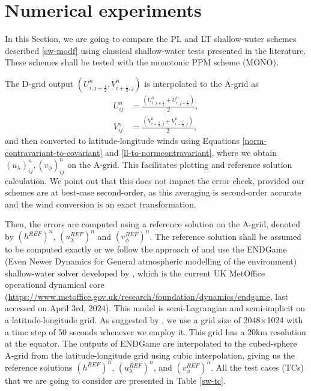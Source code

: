 \section{Numerical experiments}
\label{sec:numerical_results}
In this Section, we are going to compare the PL and LT shallow-water schemes described \eqref{sw-modf} using classical
shallow-water tests presented in the literature.
These schemes shall be tested with the monotonic PPM scheme (MONO).

The D-grid output $(U_{i,j+\frac{1}{2}}^n,V_{i+\frac{1}{2},j}^n)$ is interpolated to the A-grid as
\begin{align}
U_{ij}^n &= \frac{(U_{i,j+\frac{1}{2}}^n+U_{i,j-\frac{1}{2}}^n)}{2},\\
V_{ij}^n &= \frac{(V_{i+\frac{1}{2},j}^n+V_{i-\frac{1}{2},j}^n)}{2},
\end{align}
and then converted to latitude-longitude winds using Equations \eqref{norm-contravariant-to-covariant} and \eqref{ll-to-normcontravariant},
where we obtain $(u_{\lambda})_{ij}^n,(v_{\phi})_{ij}^n$ on the A-grid.
This facilitates plotting and reference solution calculation. 
We point out that this does not impact the error check, 
provided our schemes are at best-case second-order, 
as this averaging is second-order accurate and the wind conversion is an exact transformation.

Then, the errors are computed using a reference solution on the A-grid, denoted by $(h^{REF})^n$, $(u_{\lambda}^{REF})^n$ and $(v_{\phi}^{REF})^n$. 
The reference solution shall be assumed to be computed exactly or we follow the approach of \citet{peixoto:2016} and use
the ENDGame (Even Newer Dynamics for General atmospheric modelling of the environment) shallow-water solver developed by \citet{thuburn:2010},
which is the current UK MetOffice operational dynamical core 
(\url{https://www.metoffice.gov.uk/research/foundation/dynamics/endgame}, last accessed on April 3rd, 2024).
This model is semi-Lagrangian and semi-implicit on a latitude-longitude grid.
As suggested by \citet{peixoto:2016}, we use a grid size of 2048$\times$1024 with a time step of 50 seconds whenever we employ it.
This grid has a 20km resolution at the equator.
The outputs of ENDGame are interpolated to the cubed-sphere A-grid from the latitude-longitude grid using cubic interpolation,
giving us the reference solutions $(h^{REF})^n$, $(u_{\lambda}^{REF})^n$, and $(v_{\phi}^{REF})^n$.
All the test cases (TCs) that we are going to consider are presented in Table \ref{sw-tc}.

